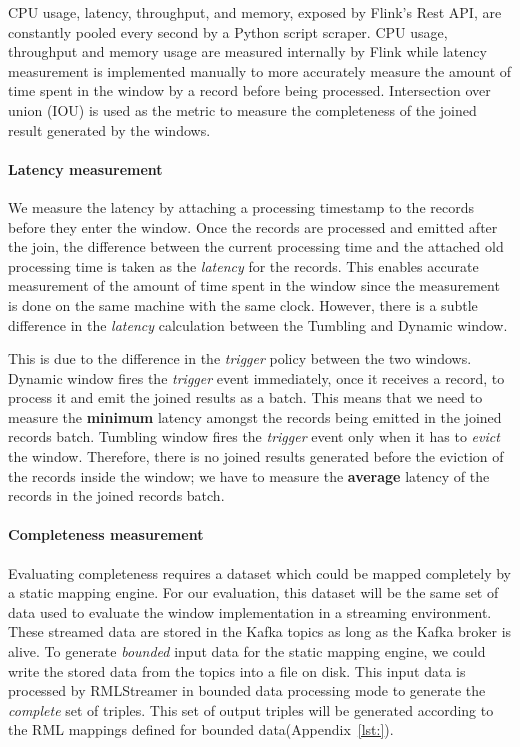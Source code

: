 CPU usage, latency, throughput, and memory, exposed 
by Flink's Rest API, are constantly pooled  every second by a 
Python script scraper.
CPU usage, throughput 
and memory usage are measured internally by Flink
while
latency measurement 
is implemented manually to more accurately measure the amount of 
time spent in the window by a record before being processed. 
Intersection over union (IOU) is used as the metric to measure the completeness
of the joined result generated by the windows. 

\paragraph{Latency measurement}%
\label{par:Latency measurement}
We measure the latency by attaching a processing timestamp to the records before they enter the window. 
Once the records are processed and emitted after the join, the difference 
between the current processing time and the attached old processing time 
is taken as the \emph{latency} for the records. This enables accurate measurement of
the amount of time spent in the window since the measurement is done on the 
same machine with the same clock. However, there is a subtle difference
in the \emph{latency} calculation between the Tumbling and Dynamic window.


This is due to the difference in the \emph{trigger} policy between the two windows. 
Dynamic window fires the \emph{trigger} event immediately, once it receives a record, 
to process it and emit the joined results as a batch. This means that we need to measure the 
\textbf{minimum} latency amongst the records being emitted in the joined records batch. 
Tumbling window fires the \emph{trigger} event only when it has to \emph{evict} the window. 
Therefore, there is no joined results generated before the eviction of the records 
inside the window; we have to measure the \textbf{average} latency of the records in the joined 
records batch. 

\paragraph{Completeness measurement}%
\label{par:Completeness measurement}
Evaluating completeness requires a dataset which could be mapped completely by a static 
mapping engine. For our evaluation, this dataset will be the same set of data used to 
evaluate the window implementation in a streaming environment. These streamed data are 
stored in the Kafka topics as long as the Kafka broker is alive. 
To generate \emph{bounded} input data for 
the static mapping engine, we could write the stored data from the topics 
into a file on disk. This input data is processed by RMLStreamer in bounded data 
processing mode to generate the \emph{complete} set of triples. 
This set of output triples will be generated according 
to the RML mappings defined for bounded data(Appendix~\ref{lst:}). 

